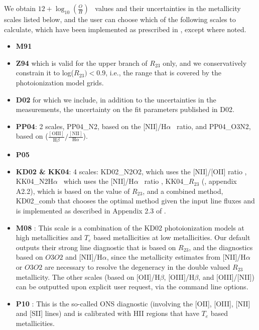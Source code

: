 \documentclass{emulateapj}
\newcommand{\oxab}{\ensuremath{12 + \log_{10}(\frac{O}{H})}}
\newcommand{\ha}{H$\alpha$}
\newcommand{\hb}{H$\beta$}
\begin{document}
We obtain \oxab~ values and their uncertainties in the metallicity scales listed below, and the user can choose which of the following scales to calculate, which have been implemented as prescribed in \citet{kewley08}, except where noted. 
\begin{itemize}
\item {\bf M91} \citep{mcgaugh91}
\item {\bf Z94} \citep{zaritsky94} which is valid for the upper branch of $R_{23}$ only, and we conservatively constrain it to log($R_{23})<0.9$, i.e., the range that is covered by the photoionization model grids.
\item {\bf D02} \citep{denicolo02} for which we include, in addition to the uncertainties in the measurements, the uncertainty on the fit parameters published in D02.
\item {\bf PP04}:  \citep{pettini04} 2 scales,  PP04\_N2, based on the [NII]/\ha~ ratio, and PP04\_O3N2, based on  ($\frac{\mathrm{[OIII]}}{\mathrm{H}\beta}/\frac{\mathrm{[NII]}}{\mathrm{H}\alpha}$).  
\item {\bf P05} \citep{pilyugin05}
\item {\bf KD02 \& KK04}: 4 scales: KD02\_N2O2, which uses the [NII]/[OII] ratio \citep{kewley02}, KK04\_N2\ha~  which uses the [NII]/\ha~ ratio \citep{kobulnicky04}, KK04\_$R_{23}$ (\citealt{kewley08}, appendix A2.2), which is based on the value of $R_{23}$, and a combined method, KD02\_comb that chooses the optimal method given the input line fluxes and is implemented as described in Appendix 2.3 of \citet{kewley08}. 
\item {\bf M08} \citep{maiolino08}: This scale is a combination of the KD02 photoionization models at high metallicities and $T_e$ based metallicities at low metallicities. Our default outputs their strong line diagnostic that is based on $R_{23}$, and the diagnostics based on $O3O2$ and [NII]/\ha, since the metallicity estimates from  [NII]/\ha~ or $O3O2$ are necessary to resolve the degeneracy in the double valued $R_{23}$ metallicity. The other scales (based on [OII]/\hb, [OIII]/\hb, and [OIII]/[NII]) can be outputted upon explicit user request, via the command line options. 
\item {\bf P10} \citep{pilyugin10}: This is the so-called ONS diagnostic (involving the [OII], [OIII], [NII] and [SII] lines) and is calibrated with HII regions that have $T_e$ based metallicities.

\end{itemize}
\end{document}
